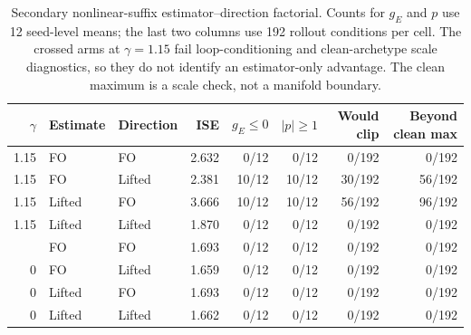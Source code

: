 \begin{table}[H]
\centering
\scriptsize
\begin{tabular}{@{}rllrrrrr@{}}
\toprule
$\gamma$ & Estimate & Direction & ISE & $g_E\!\leq\!0$ & $|p|\!\geq\!1$ & Would clip & Beyond clean max \\
\midrule
1.15 & FO & FO & 2.632 & 0/12 & 0/12 & 0/192 & 0/192 \\
1.15 & FO & Lifted & 2.381 & 10/12 & 10/12 & 30/192 & 56/192 \\
1.15 & Lifted & FO & 3.666 & 10/12 & 10/12 & 56/192 & 96/192 \\
1.15 & Lifted & Lifted & 1.870 & 0/12 & 0/12 & 0/192 & 0/192 \\
\addlinespace
0 & FO & FO & 1.693 & 0/12 & 0/12 & 0/192 & 0/192 \\
0 & FO & Lifted & 1.659 & 0/12 & 0/12 & 0/192 & 0/192 \\
0 & Lifted & FO & 1.693 & 0/12 & 0/12 & 0/192 & 0/192 \\
0 & Lifted & Lifted & 1.662 & 0/12 & 0/12 & 0/192 & 0/192 \\
\bottomrule
\end{tabular}
\caption{Secondary nonlinear-suffix estimator--direction factorial. Counts for $g_E$ and $p$ use 12 seed-level means; the last two columns use 192 rollout conditions per cell. The crossed arms at $\gamma=1.15$ fail loop-conditioning and clean-archetype scale diagnostics, so they do not identify an estimator-only advantage. The clean maximum is a scale check, not a manifold boundary.}
\label{tab:nonlinear-suffix-factorial}
\end{table}
